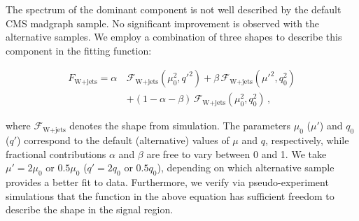 The \mjj spectrum of the dominant \Wpj component is not well described
by the default CMS {\sc madgraph} sample.  No significant improvement
is observed with the alternative \Wpj samples.  We employ a combination of
three shapes to describe this component in the fitting function:
\begin{linenomath}
\begin{align}
F_{\text{W+jets}} = \alpha\, & \mathcal{F}_{\text{W+jets}} (\mu_{0}^2, q'^2) + 
\beta\, \mathcal{F}_{\text{W+jets}} (\mu'^2, q_{0}^2) \nonumber \\ 
&+ (1-\alpha-\beta)\, \mathcal{F}_{\text{W+jets}} (\mu_{0}^2, q_{0}^2)\,,
\label{eqWpjetsShape}
\nonumber
\end{align}
\end{linenomath}
where $\mathcal{F}_{\text{W+jets}}$ denotes the \mjj shape from
simulation.  The parameters $\mu_0$ ($\mu'$) and $q_0$ ($q'$)
correspond to the default (alternative) values of $\mu$ and $q$,
respectively, while fractional contributions $\alpha$ and $\beta$ are
free to vary between 0 and 1.  We take $\mu' = 2 \mu_0$ or $0.5 \mu_0$
($q' = 2 q_0$ or $0.5 q_0$), depending on which alternative sample
provides a better fit to data.  Furthermore, we verify via
pseudo-experiment simulations that the function in the above equation
has sufficient freedom to describe the \Wpj shape in the signal
region.

